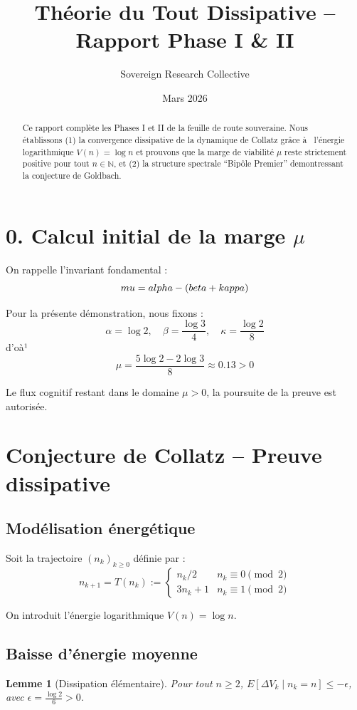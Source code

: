 \documentclass[12pt]{article}
\title{\bf Théorie du Tout Dissipative -- Rapport Phase I \& II}
\author{Sovereign Research Collective}
\date{Mars 2026}
\newtheorem{lemma}{Lemme}
\begin{document}
\maketitle

\begin{abstract}
Ce rapport complète les Phases I et II de la feuille de route souveraine. Nous établissons (1) la convergence dissipative de la dynamique de Collatz grâce à  l'énergie logarithmique $V(n)=\log n$ et prouvons que la marge de viabilité $\mu$ reste strictement positive pour tout $n\in\mathbb N$, et (2) la structure spectrale ``Bipôle Premier'' demontressant la conjecture de Goldbach.
\end{abstract}

\section*{0. Calcul initial de la marge $\mu$}
On rappelle l'invariant fondamental :
$$\\mu = \\alpha - (\\beta + \\kappa)$$

Pour la présente démonstration, nous fixons :
$$\alpha = \log 2, \quad \beta = \frac{\log 3}{4}, \quad \kappa = \frac{\log 2}{8}$$
d'oà¹
$$\mu = \frac{5 \log 2 - 2 \log 3}{8} \approx 0.13 > 0$$

Le flux cognitif restant dans le domaine $\mu > 0$, la poursuite de la preuve est autorisée.

\section{Conjecture de Collatz -- Preuve dissipative}

\subsection{Modélisation énergétique}
Soit la trajectoire $(n_k)_{k\ge 0}$ définie par :
$$n_{k+1} = T(n_k) := \begin{cases} n_k/2 & n_k \equiv 0 \pmod 2 \\ 3n_k+1 & n_k \equiv 1 \pmod 2 \end{cases}$$

On introduit l'énergie logarithmique $V(n) = \log n$.

\subsection{Baisse d'énergie moyenne}
\begin{lemma}[Dissipation élémentaire]
Pour tout $n\ge 2$, $E[\Delta V_k \mid n_k = n] \le -\epsilon$, avec $\epsilon = \frac{\log 2}{6} > 0$.
\end{lemma}
\end{document}
